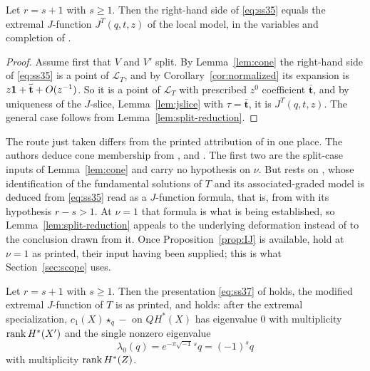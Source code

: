 \begin{proposition}
  \label{prop:IJ}
  Let \(r=s+1\) with \(s\ge1\).  Then the right-hand side of
  \eqref{eq:ss35} equals the extremal \(J\)-function \(J^{T}(q,t,z)\) of the
  local model, in the variables and completion of \cite[Theorem~4.4]{SS}.
\end{proposition}

\begin{proof}
  Assume first that \(V\) and \(V'\) split.  By Lemma~\ref{lem:cone} the
  right-hand side of \eqref{eq:ss35} is a point of \(\mathcal L_{T}\), and by
  Corollary~\ref{cor:normalized} its expansion is
  \(z\mathbf 1+\bar{\mathbf t}+O(z^{-1})\).  So it is a point of \(\mathcal
  L_{T}\) with prescribed \(z^{0}\) coefficient \(\bar{\mathbf t}\), and by
  uniqueness of the \(J\)-slice, Lemma~\ref{lem:jslice} with
  \(\tau=\bar{\mathbf t}\), it is \(J^{T}(q,t,z)\).  The general case follows
  from Lemma~\ref{lem:split-reduction}.
\end{proof}

\begin{remark}
  \label{rem:circularity}
  The route just taken differs from the printed attribution of
  \cite[Remark~4.5(3)]{SS} in one place.  The authors deduce cone membership
  from \cite{Brown}, \cite{CoatesGivental} and \cite[Lemma~9.6]{SS}.  The
  first two are the split-case inputs of Lemma~\ref{lem:cone} and carry no
  hypothesis on \(\nu\).  But \cite[Lemma~9.6]{SS} rests on
  \cite[Lemma~9.4]{SS}, whose identification of the fundamental solutions of
  \(T\) and its associated-graded model is deduced from \eqref{eq:ss35}
  read as a \(J\)-function formula, that is, from \cite[Theorem~4.4]{SS} with
  its hypothesis \(r-s>1\).  At \(\nu=1\) that formula is what is being
  established, so Lemma~\ref{lem:split-reduction} appeals to the underlying
  deformation instead of to the conclusion drawn from it.  Once
  Proposition~\ref{prop:IJ} is available, \cite[Lemmas~9.4--9.6]{SS} hold at
  \(\nu=1\) as printed, their input having been supplied; this is what
  Section~\ref{sec:scope} uses.
\end{remark}

\begin{corollary}
  \label{cor:presentation}
  Let \(r=s+1\) with \(s\ge1\).  Then the presentation \eqref{eq:ss37} of
  \cite[Theorem~4.6]{SS} holds, the modified extremal \(J\)-function
  \cite[(39)--(40)]{SS} of \(T\) is as printed, and
  \cite[Theorem~1.2]{SS} holds: after the extremal
  specialization, \(c_{1}(X)\star_{q}-\) on \(QH^{*}(X)\) has eigenvalue
  \(0\) with multiplicity \(\operatorname{rank} H^{*}(X')\) and the single nonzero
  eigenvalue
  \[
    \lambda_{0}(q)=e^{-\pi\sqrt{-1}\,s}q=(-1)^{s}q
  \]
  with multiplicity \(\operatorname{rank} H^{*}(Z)\).
\end{corollary}

